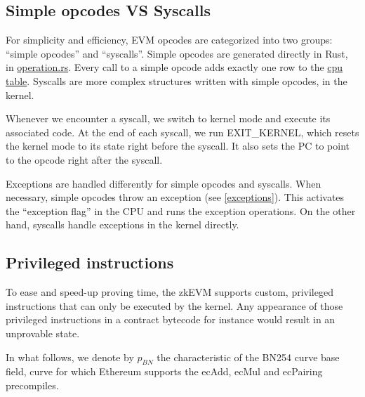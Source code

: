 \subsection{Simple opcodes VS Syscalls}
For simplicity and efficiency, EVM opcodes are categorized into two groups: ``simple opcodes'' and ``syscalls''. Simple opcodes are generated directly in Rust, in \href{https://github.com/0xPolygonZero/plonky2/blob/main/evm/src/witness/operation.rs}{operation.rs}. Every call to a simple opcode adds exactly one row to the \href{https://github.com/0xPolygonZero/plonky2/blob/main/evm/spec/tables/cpu.tex}{cpu table}. Syscalls are more complex structures written with simple opcodes, in the kernel.

Whenever we encounter a syscall, we switch to kernel mode and execute its associated code. At the end of each syscall, we run EXIT\_KERNEL, which resets the kernel mode to its state right before the syscall. It also sets the PC to point to the opcode right after the syscall.

Exceptions are handled differently for simple opcodes and syscalls. When necessary, simple opcodes throw an exception (see \ref{exceptions}). This activates the ``exception flag'' in the CPU and runs the exception operations. On the other hand, syscalls handle exceptions in the kernel directly.

\subsection{Privileged instructions}

To ease and speed-up proving time, the zkEVM supports custom, privileged instructions that can only be executed by the kernel.
Any appearance of those privileged instructions in a contract bytecode for instance would result in an unprovable state.

In what follows, we denote by $p_{BN}$ the characteristic of the BN254 curve base field, curve for which Ethereum supports the 
ecAdd, ecMul and ecPairing precompiles.

